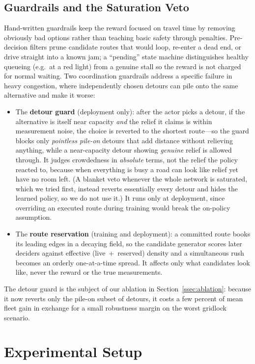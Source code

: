 \subsection{Guardrails and the Saturation Veto}
Hand-written guardrails keep the reward focused on travel time by removing obviously bad
options rather than teaching basic safety through penalties. Pre-decision filters prune
candidate routes that would loop, re-enter a dead end, or drive straight into a known jam;
a ``pending'' state machine distinguishes healthy queueing (e.g.\ at a red light) from a
genuine stall so the reward is not charged for normal waiting. Two coordination guardrails
address a specific failure in heavy congestion, where independently chosen detours can pile
onto the same alternative and make it worse:
\begin{itemize}
  \item The \textbf{detour guard} (deployment only): after the actor picks a detour, if the
  alternative is itself near capacity \emph{and} the relief it claims is within measurement
  noise, the choice is reverted to the shortest route---so the guard blocks only
  \emph{pointless pile-on} detours that add distance without relieving anything, while a
  near-capacity detour showing \emph{genuine} relief is allowed through. It judges
  crowdedness in \emph{absolute} terms, not the relief the policy reacted to, because when
  everything is busy a road can look like relief yet have no room left. (A blanket veto
  whenever the whole network is saturated, which we tried first, instead reverts essentially
  every detour and hides the learned policy, so we do not use it.) It runs only at
  deployment, since overriding an executed route during training would break the on-policy
  assumption.
  \item The \textbf{route reservation} (training and deployment): a committed route books
  its leading edges in a decaying field, so the candidate generator scores later deciders
  against effective (live~+~reserved) density and a simultaneous rush becomes an orderly
  one-at-a-time spread. It affects only what candidates look like, never the reward or the
  true measurements.
\end{itemize}
The detour guard is the subject of our ablation in Section~\ref{ssec:ablation}: because it
now reverts only the pile-on subset of detours, it costs a few percent of mean fleet gain
in exchange for a small robustness margin on the worst gridlock scenario.

\section{Experimental Setup}\label{sec:setup}

